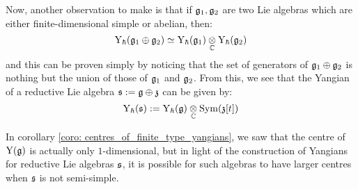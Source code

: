         Now, another observation to make is that if $\mathfrak{g}_1, \mathfrak{g}_2$ are two Lie algebras which are either finite-dimensional simple or abelian, then:
            $$\rmY_{\hbar}(\g_1 \oplus \g_2) \cong \rmY_{\hbar}(\g_1) \tensor_{\bbC} \rmY_{\hbar}(\g_2)$$
        and this can be proven simply by noticing that the set of generators of $\mathfrak{g}_1 \oplus \mathfrak{g}_2$ is nothing but the union of those of $\mathfrak{g}_1$ and $\mathfrak{g}_2$. From this, we see that the Yangian of a reductive Lie algebra $\mathfrak{s} := \mathfrak{g} \oplus \mathfrak{z}$ can be given by:
            $$\rmY_{\hbar}(\s) := \rmY_{\hbar}(\g) \tensor_{\bbC} \Sym(\z[t])$$

        In corollary \ref{coro: centres_of_finite_type_yangians}, we saw that the centre of $\mathrm{Y}(\mathfrak{g})$ is actually only $1$-dimensional, but in light of the construction of Yangians for reductive Lie algebras $\mathfrak{s}$, it is possible for such algebras to have larger centres when $\mathfrak{s}$ is not semi-simple.

